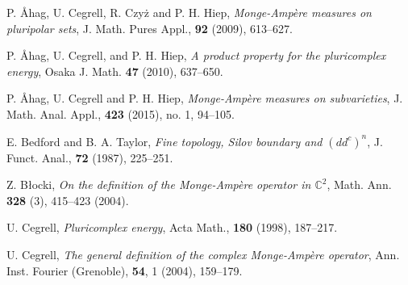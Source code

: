\documentclass[3p,times]{elsarticle}
\numberwithin{equation}{section}
\newtheorem{The main theorem}[theorem]{The main theorem}
\theoremstyle{definition}
\begin{document}
 \begin{thebibliography}{00}



 P. \AA hag, U. Cegrell, R. Czy\. z and P. H. Hiep,  {\em Monge-Amp\`{e}re measures on pluripolar sets}, J. Math. Pures Appl., {\bf  92} (2009), 613--627.

 P. \AA hag, U. Cegrell,  and P. H. Hiep,  {\em A product property for the pluricomplex energy}, 
Osaka J. Math. {\bf 47} (2010), 637--650.


 P. \AA hag, U. Cegrell  and P. H. Hiep,  {\em Monge-Amp\`ere measures on subvarieties},  J. Math. Anal. Appl., {\bf  423} (2015), no. 1, 94--105.


 E. Bedford and B. A. Taylor, {\em  Fine topology, Silov boundary and $(dd^c)^n$},  J. Funct. Anal., {\bf 72} (1987), 225--251.




 Z. B\l ocki, {\em On the definition of the Monge-Amp\`ere operator in $\mathbb C^2$},  Math. Ann. {\bf 328} (3), 415--423 (2004).

 U. Cegrell, {\it Pluricomplex energy}, Acta Math., {\bf 180} (1998), 187--217.


 U. Cegrell, {\it The general definition of the complex Monge-Amp\` ere operator}, Ann. Inst. Fourier (Grenoble), {\bf 54}, 1 (2004), 159--179.



 




\end{thebibliography}
\end{document}
